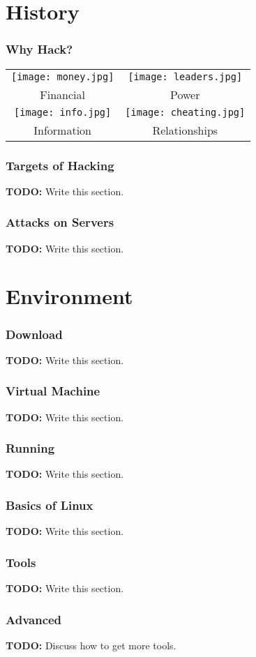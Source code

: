 \documentclass[10pt]{beamer}
\begin{document}
  \section[History]{History}
  \begin{frame}
    \frametitle{Why Hack?}
    \centering
    \begin{tabular}{c c}
      \texttt{[image: money.jpg]}     &
      \texttt{[image: leaders.jpg]}  \\
      Financial                                                   &
      Power                                                      \\
      \texttt{[image: info.jpg]}      &
      \texttt{[image: cheating.jpg]} \\
      Information                                                 &
      Relationships                                              \\
    \end{tabular}
  \end{frame}
  \begin{frame}
    \frametitle{Targets of Hacking}
    \textbf{TODO:} Write this section.
  \end{frame}
  \begin{frame}
    \frametitle{Attacks on Servers}
    \textbf{TODO:} Write this section.
  \end{frame}
  \section[Env]{Environment}
  \begin{frame}
    \frametitle{Download}
    \textbf{TODO:} Write this section.
  \end{frame}
  \begin{frame}
    \frametitle{Virtual Machine}
    \textbf{TODO:} Write this section.
  \end{frame}
  \begin{frame}
    \frametitle{Running}
    \textbf{TODO:} Write this section.
  \end{frame}
  \begin{frame}
    \frametitle{Basics of Linux}
    \textbf{TODO:} Write this section.
  \end{frame}
  \begin{frame}
    \frametitle{Tools}
    \textbf{TODO:} Write this section.
  \end{frame}
  \begin{frame}
    \frametitle{Advanced}
    \textbf{TODO:} Discuss how to get more tools.
  \end{frame}
\end{document}

